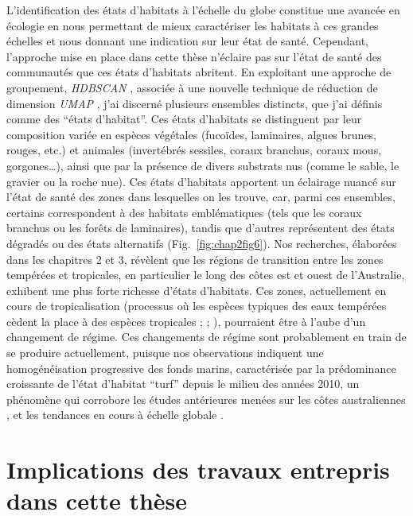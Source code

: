 \begin{refsection}
L'identification des états d'habitats à l'échelle du globe constitue une
avancée en écologie en nous permettant de mieux caractériser les
habitats à ces grandes échelles et nous donnant une indication sur leur
état de santé. Cependant, l'approche mise en place dans cette thèse
n'éclaire pas sur l'état de santé des communautés que ces états
d'habitats abritent. En exploitant une approche de groupement,
\emph{HDBSCAN} \autocite{McInnes2017}, associée à une nouvelle technique
de réduction de dimension \emph{UMAP} \autocite{McInnes_2020}, j'ai
discerné plusieurs ensembles distincts, que j'ai définis comme des
``états d'habitat''. Ces états d'habitats se distinguent par leur
composition variée en espèces végétales (fucoïdes, laminaires, algues
brunes, rouges, etc.) et animales (invertébrés sessiles, coraux
branchus, coraux mous, gorgones\ldots), ainsi que par la présence de
divers substrats nus (comme le sable, le gravier ou la roche nue). Ces
états d'habitats apportent un éclairage nuancé sur l'état de santé des
zones dans lesquelles on les trouve, car, parmi ces ensembles, certains
correspondent à des habitats emblématiques (tels que les coraux branchus
ou les forêts de laminaires), tandis que d'autres représentent des états
dégradés ou des états alternatifs (Fig.~\ref{fig:chap2fig6}). Nos
recherches, élaborées dans les chapitres 2 et 3, révèlent que les
régions de transition entre les zones tempérées et tropicales, en
particulier le long des côtes est et ouest de l'Australie, exhibent une
plus forte richesse d'états d'habitats. Ces zones, actuellement en cours
de tropicalisation (processus où les espèces typiques des eaux tempérées
cèdent la place à des espèces tropicales ; \textcite{Verges_2014} ;
\textcite{Verges_2019}), pourraient être à l'aube d'un changement de
régime. Ces changements de régime sont probablement en train de se
produire actuellement, puisque nos observations indiquent une
homogénéisation progressive des fonds marins, caractérisée par la
prédominance croissante de l'état d'habitat ``turf'' depuis le milieu
des années 2010, un phénomène qui corrobore les études antérieures
menées sur les côtes australiennes \autocite{Pessarrodona_2022}, et les
tendances en cours à échelle globale \autocite{Filbee-Dexter_2018}.

\clearpage

\hypertarget{implications-des-travaux-entrepris-dans-cette-thuxe8se}{%
\section{Implications des travaux entrepris dans cette
thèse}\label{implications-des-travaux-entrepris-dans-cette-thuxe8se}}


\end{refsection}
